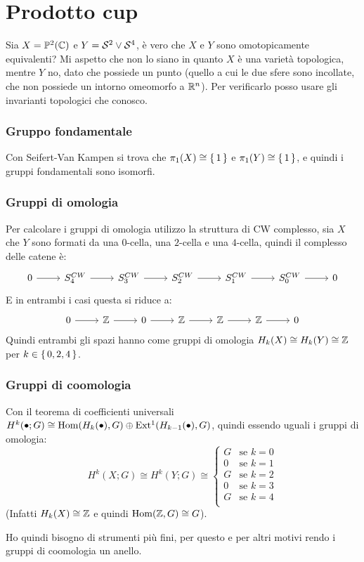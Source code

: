 
\section{Prodotto cup}

\begin{example}
  Sia $ X = \mathbb{P}^{2} (\mathbb{C}) $ e $ Y = \mathcal{S}^{2} \vee \mathcal{S}^{4} $, è vero che $ X $ e $ Y $ sono
  omotopicamente equivalenti? Mi aspetto che non lo siano in quanto $ X $ è una
  varietà topologica, mentre $ Y $ no, dato che possiede un punto (quello a cui
  le due sfere sono incollate, che non possiede un intorno omeomorfo a
  $ \mathbb{R}^{n} $). Per verificarlo posso usare gli invarianti topologici che
  conosco.
  \subsubsection{Gruppo fondamentale}
  Con Seifert-Van Kampen si trova che $ \pi_1(X) \cong \set{1} $ e
  $ \pi_1(Y) \cong \set{1} $, e quindi i gruppi fondamentali sono isomorfi.
  \subsubsection{Gruppi di omologia}
  Per calcolare i gruppi di omologia utilizzo la struttura di CW complesso,
  sia $ X $ che $ Y $ sono formati da una $ 0 $-cella, una $ 2 $-cella e una
  $ 4 $-cella, quindi il complesso delle catene è:
  \[
    \begin{tikzcd}
      0 \rar & S_4^{CW} \rar & S_3^{CW} \rar & S_2^{CW} \rar & S_1^{CW} \rar & S_0^{CW} \rar & 0
    \end{tikzcd}
  \]
  E in entrambi i casi questa si riduce a:
  \[
    \begin{tikzcd}
      0 \rar & \Z \rar & 0 \rar & \Z \rar & \Z \rar & \Z \rar & 0
    \end{tikzcd}
  \]
  Quindi entrambi gli spazi hanno come gruppi di omologia
  $ H_k(X) \cong H_k(Y) \cong \mathbb{Z} $ per $ k \in \set{0,2,4} $.
  \subsubsection{Gruppi di coomologia}
  Con il teorema di coefficienti universali $ H^k(\bullet;G) \cong \mathrm{Hom}( H_k(\bullet), G) \oplus \mathrm{Ext^1}( H_{k-1}(\bullet), G) $,
  quindi essendo uguali i gruppi di omologia:
  \[
    H^k(X;G) \cong H^k(Y;G) \cong
    \begin{cases}
      G & \text{se } k = 0 \\
      0 & \text{se } k = 1 \\
      G & \text{se } k = 2 \\
      0 & \text{se } k = 3 \\
      G & \text{se } k = 4 \\
    \end{cases}
  \]
  (Infatti $ H_k(X) \cong \mathbb{Z} $ e quindi $ \mathrm{Hom}( \mathbb{Z}, G) \cong G $).

  Ho quindi bisogno di strumenti più fini, per questo e per altri motivi rendo i
  gruppi di coomologia un anello.

\end{example}

